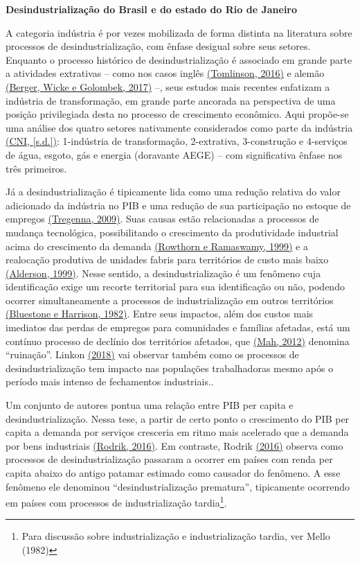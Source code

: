 \textbf{Desindustrialização do Brasil e do estado do Rio de Janeiro}

A categoria indústria é por vezes mobilizada de forma distinta na
literatura sobre processos de desindustrialização, com ênfase desigual
sobre seus setores. Enquanto o processo histórico de desindustrialização
é associado em grande parte a atividades extrativas -- como nos casos
inglês \href{https://www.zotero.org/google-docs/?dvLJw6}{(Tomlinson,
2016)} e alemão
\href{https://www.zotero.org/google-docs/?TzOvAP}{(Berger, Wicke e
Golombek, 2017)} --, seus estudos mais recentes enfatizam a indústria de
transformação, em grande parte ancorada na perspectiva de uma posição
privilegiada desta no processo de crescimento econômico. Aqui propõe-se
uma análise dos quatro setores nativamente considerados como parte da
indústria \href{https://www.zotero.org/google-docs/?iSA9Xh}{(CNI,
{[}s.d.{]})}: 1-indústria de transformação, 2-extrativa, 3-construção e
4-serviços de água, esgoto, gás e energia (doravante AEGE) -- com
significativa ênfase nos três primeiros.

Já a desindustrialização é tipicamente lida como uma redução relativa do
valor adicionado da indústria no PIB e uma redução de sua participação
no estoque de empregos
\href{https://www.zotero.org/google-docs/?k039Yz}{(Tregenna, 2009)}.
Suas causas estão relacionadas a processos de mudança tecnológica,
possibilitando o crescimento da produtividade industrial acima do
crescimento da demanda
\href{https://www.zotero.org/google-docs/?niRiWF}{(Rowthorn e Ramaswamy,
1999)} e a realocação produtiva de unidades fabris para territórios de
custo mais baixo
\href{https://www.zotero.org/google-docs/?Qt10Wg}{(Alderson, 1999)}.
Nesse sentido, a desindustrialização é um fenômeno cuja identificação
exige um recorte territorial para sua identificação ou não, podendo
ocorrer simultaneamente a processos de industrialização em outros
territórios \href{https://www.zotero.org/google-docs/?dQKhXi}{(Bluestone
e Harrison, 1982)}. Entre seus impactos, além dos custos mais imediatos
das perdas de empregos para comunidades e famílias afetadas, está um
contínuo processo de declínio dos territórios afetados, que
\href{https://www.zotero.org/google-docs/?tIvUMy}{(Mah, 2012)} denomina
``ruinação''. Linkon
\href{https://www.zotero.org/google-docs/?MfNH7j}{(2018)} vai observar
também como os processos de desindustrialização tem impacto nas
populações trabalhadoras mesmo após o período mais intenso de
fechamentos industriais..

Um conjunto de autores pontua uma relação entre PIB per capita e
desindustrialização. Nessa tese, a partir de certo ponto o crescimento
do PIB per capita a demanda por serviços cresceria em ritmo mais
acelerado que a demanda por bens industriais
\href{https://www.zotero.org/google-docs/?uvhkcx}{(Rodrik, 2016)}. Em
contraste, Rodrik
\href{https://www.zotero.org/google-docs/?KF8pD8}{(2016)} observa como
processos de desindustrialização passaram a ocorrer em países com renda
per capita abaixo do antigo patamar estimado como causador do fenômeno.
A esse fenômeno ele denominou ``desindustrialização prematura'',
tipicamente ocorrendo em países com processos de industrialização
tardia\footnote{Para discussão sobre industrialização e industrialização
  tardia, ver Mello (1982)}.

